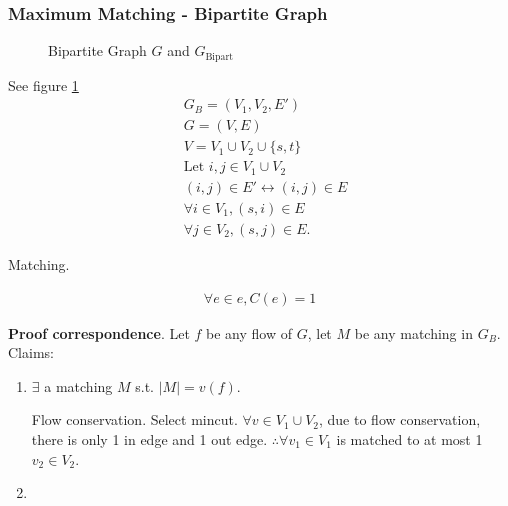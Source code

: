\documentclass[a4paper]{report}
\theoremstyle{definition}
\begin{document}
\subsubsection{Maximum Matching - Bipartite Graph}
\begin{figure}[!htp]
\centering
{}
\caption{Bipartite Graph $G$ and $G_\text{Bipart}$}
\label{fig:bipart}
\end{figure}
See figure \ref{fig:bipart}
\begin{align*}
& G_B = (V_1, V_2, E') \\
& G=(V, E) \\
& V= V_1 \cup V_2\cup \{s, t\}\\
& \text{Let } i, j \in V_1 \cup V_2\\
& (i,j)\in E' \leftrightarrow (i, j)\in E\\
& \forall i \in V_1, (s, i) \in E \\
& \forall j \in V_2, (s, j) \in E.
\end{align*}

Matching.

\begin{align*}
\forall e \in e, C(e) =1
\end{align*}

\textbf{Proof correspondence}. Let $f$ be any flow of $G$, let $M$ be any matching in $G_B$. Claims:
\begin{enumerate}
\item $\exists$ a matching $M$ s.t. $|M|=v(f)$.

Flow conservation. Select mincut. $\forall v \in V_1\cup V_2$, due to flow conservation, there is only 1 in edge and 1 out edge. $\therefore \forall v_1 \in V_1$ is matched to at most 1 $v_2 \in V_2. $
\item
\end{enumerate}
\end{document}
